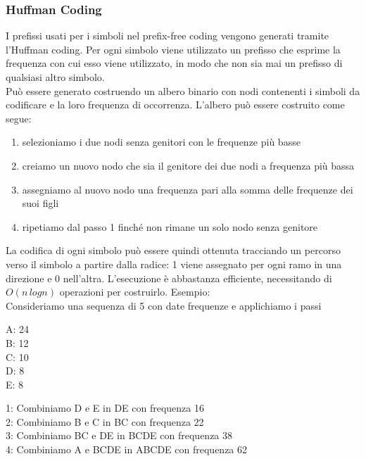 \documentclass[a4paper,11pt]{article} %
\begin{document}
\subsubsection{Huffman Coding}
I prefissi usati per i simboli nel prefix-free coding vengono generati tramite l'Huffman coding. Per ogni simbolo viene utilizzato un prefisso che esprime la frequenza con cui esso viene utilizzato, in modo che non sia mai un prefisso di qualsiasi altro simbolo.\\ Può essere generato costruendo un albero binario con nodi contenenti i simboli da codificare e la loro frequenza di occorrenza. L'albero può essere costruito come segue:
\begin{enumerate}
\item selezioniamo i due nodi senza genitori con le frequenze più basse
\item creiamo un nuovo nodo che sia il genitore dei due nodi a frequenza più bassa
\item assegniamo al nuovo nodo una frequenza pari alla somma delle frequenze dei suoi figli
\item ripetiamo dal passo 1 finché non rimane un solo nodo senza genitore
\end{enumerate}
La codifica di ogni simbolo può essere quindi ottenuta tracciando un percorso verso il simbolo a partire dalla radice: 1 viene assegnato per ogni ramo in una direzione e 0 nell'altra. L'esecuzione è abbastanza efficiente, necessitando di $O(n \, logn)$ operazioni per costruirlo. Esempio:\\
Consideriamo una sequenza di 5 con date frequenze e applichiamo i passi\\
\begin{minipage}{0.1\textwidth}
A: 24 \\
B: 12\\
C: 10\\
D: 8 \\
E: 8 \\
\end{minipage}
\begin{minipage}{0.6\textwidth}
1: Combiniamo D e E in DE con frequenza 16\\
2: Combiniamo B e C in BC con frequenza 22\\
3: Combiniamo BC e DE in BCDE con frequenza 38\\
4: Combiniamo A e BCDE in ABCDE con frequenza 62\\
\end{minipage}
\end{document}
